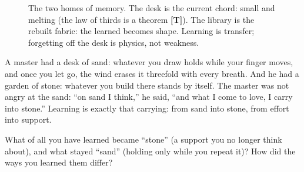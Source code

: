 \documentclass[11pt,letterpaper]{article}
\newcommand{\stT}{\textbf{[T]}\xspace}
\newcommand{\stI}{\textbf{[I]}\xspace}
\begin{document}
\begin{figure}[H]
\centering
{}
\caption{The two homes of memory. The desk is the current chord:
small and melting (the law of thirds is a theorem \stT). The
library is the rebuilt fabric: the learned becomes shape. Learning
is transfer; forgetting off the desk is physics, not weakness.}
\label{fig:memory}
\end{figure}

\begin{talebox}
A master had a desk of sand: whatever you draw holds while your
finger moves, and once you let go, the wind erases it threefold
with every breath. And he had a garden of stone: whatever you build
there stands by itself. The master was not angry at the sand: ``on
sand I think,'' he said, ``and what I come to love, I carry into
stone.'' Learning is exactly that carrying: from sand into stone,
from effort into support.
\end{talebox}

\begin{askbox}
What of all you have learned became ``stone'' (a support you no
longer think about), and what stayed ``sand'' (holding only while
you repeat it)? How did the ways you learned them differ?
\end{askbox}
\end{document}
